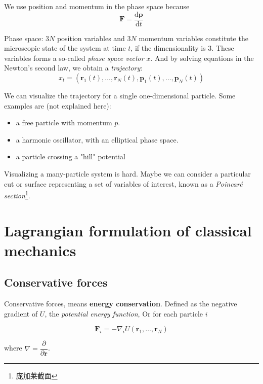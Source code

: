 \documentclass[
  10pt,
  twoside,
  openany,
  b5paper, %
  colorscheme = bootstrap-v4, %
]{qyxf-book}
\numberwithin{equation}{section}
\newcommand{\md}{\mathrm{d}}
\newcommand{\der}[2]{\dfrac{\md #1}{\md #2}}
\newcommand{\p}[2]{\dfrac{\partial #1}{\partial #2}}
\newcommand{\vF}{\boldsymbol{F}}
\newcommand{\vr}{\boldsymbol{r}}
\newcommand{\vp}{\boldsymbol{p}}
\begin{document}
We use position and momentum in the phase space because
\begin{equation}
	\vF=\der{\vp}{t} \label{rp}
\end{equation}

Phase space: $3N$ position variables and $3N$ momentum variables constitute the microscopic state of the system at time $t$, if the dimensionality is 3. These variables forms a so-called \textit{phase space vector} $x$. And by solving equations in the Newton's second law, we obtain a \textit{trajectory}:
\begin{equation}
	x_t=\left(\vr_1(t), \dots, \vr_N(t), \vp_1(t), \dots, \vp_N(t)\right) \label{eq:phase-space-vector}
\end{equation}

We can visualize the trajectory for a single one-dimensional particle. Some examples are (not explained here):
\begin{itemize}
	\item a free particle with momentum $p$.
	\item a harmonic oscillator, with an elliptical phase space.
	\item a particle crossing a "hill" potential
\end{itemize}

Visualizing a many-particle system is hard. Maybe we can consider a particular cut or surface representing a set of variables of interest, known as a \textit{Poincar{\'e} section}\footnote{庞加莱截面}.

\section{Lagrangian formulation of classical mechanics}

\vspace{0.5em}
\subsection{Conservative forces}
Conservative forces, means \textbf{energy conservation}. Defined as the negative gradient of $U$, the \textit{potential energy function}, Or for each particle $i$
\begin{tcolorbox}
	\begin{equation}
		\vF_i=-\nabla_i U(\vr_1,\dots,\vr_N) \label{eq:conservative}
	\end{equation}
\end{tcolorbox}
where $\nabla=\p{}{\vr}$. 
\end{document}
